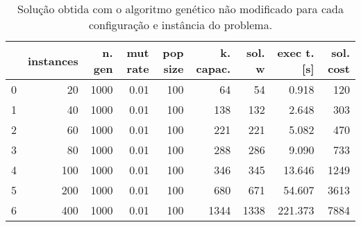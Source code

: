\begin{table}[H]
\centering
\begin{tabular}{lrrrrrrrr}
\toprule
{} &  instances &  n. gen &  mut rate &  pop size &  k. capac. &  sol. w &  exec t. [s] &  sol. cost \\
\midrule
0 &         20 &    1000 &      0.01 &       100 &         64 &      54 &        0.918 &        120 \\
1 &         40 &    1000 &      0.01 &       100 &        138 &     132 &        2.648 &        303 \\
2 &         60 &    1000 &      0.01 &       100 &        221 &     221 &        5.082 &        470 \\
3 &         80 &    1000 &      0.01 &       100 &        288 &     286 &        9.090 &        733 \\
4 &        100 &    1000 &      0.01 &       100 &        346 &     345 &       13.646 &       1249 \\
5 &        200 &    1000 &      0.01 &       100 &        680 &     671 &       54.607 &       3613 \\
6 &        400 &    1000 &      0.01 &       100 &       1344 &    1338 &      221.373 &       7884 \\
\bottomrule
\end{tabular}
\caption{Solução obtida com o algoritmo genético não modificado para cada configuração e instância do problema.}
\label{table:result-vanilla}
\end{table}